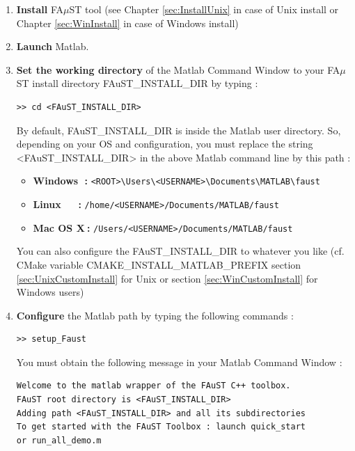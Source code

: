 \begin{enumerate}
	\item \textbf{Install} FA$\mu$ST tool (see Chapter \ref{sec:InstallUnix} in case of Unix install or Chapter \ref{sec:WinInstall} in case of Windows install)
	\item \textbf{Launch} Matlab.
	\item \textbf{Set the working directory} of the Matlab Command Window to your FA$\mu$ST install directory FAuST\_INSTALL\_DIR by typing :
		      	\begin{lstlisting}[style=customMatlab]
>> cd <FAuST_INSTALL_DIR>\end{lstlisting}	
	By default, FAuST\_INSTALL\_DIR is inside the Matlab user directory. So, depending on your OS and configuration, you must replace the string <FAuST\_INSTALL\_DIR> in the above Matlab command line by this path :
		\begin{itemize} 
			\item \textbf{Windows$\ \ \ $:} \texttt{<ROOT>\textbackslash Users\textbackslash <USERNAME>\textbackslash Documents\textbackslash MATLAB\textbackslash faust}
			\item \textbf{Linux$\ \ \ \ \ \ \ \ $:} \texttt{/home/<USERNAME>/Documents/MATLAB/faust}
			\item \textbf{Mac OS X$\ $:} \texttt{/Users/<USERNAME>/Documents/MATLAB/faust}
		\end{itemize}
	You can also configure the FAuST\_INSTALL\_DIR to whatever you like (cf. CMake variable CMAKE\_INSTALL\_MATLAB\_PREFIX section 		\ref{sec:UnixCustomInstall} for Unix or section \ref{sec:WinCustomInstall} for Windows users)
	



	\item \textbf{Configure} the Matlab path by typing the following commands :
	\lstset{style=customMatlab}
	\begin{lstlisting}
>> setup_Faust \end{lstlisting}
	You must obtain the following message in your Matlab Command Window : 
	\begin{lstlisting}
Welcome to the matlab wrapper of the FAuST C++ toolbox. 
FAuST root directory is <FAuST_INSTALL_DIR>
Adding path <FAuST_INSTALL_DIR> and all its subdirectories 
To get started with the FAuST Toolbox : launch quick_start 
or run_all_demo.m \end{lstlisting}

\end{enumerate}




